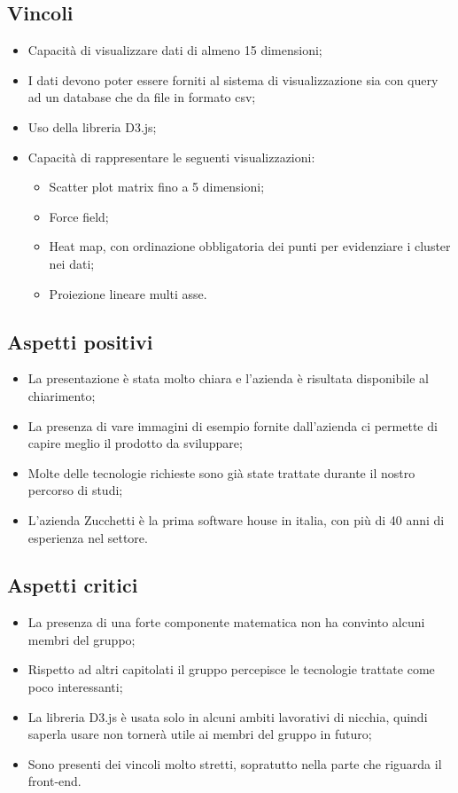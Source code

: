 \subsection{Vincoli}
\begin{itemize}
\item Capacità di visualizzare dati di almeno 15 dimensioni;
\item I dati devono poter essere forniti al sistema di visualizzazione sia con query ad un database che da file in formato csv;
\item Uso della libreria D3.js;
\item Capacità di rappresentare le seguenti visualizzazioni:
\begin{itemize}
	\item Scatter plot matrix fino a 5 dimensioni;
	\item Force field;
	\item Heat map, con ordinazione obbligatoria dei punti per evidenziare i cluster nei dati;
	\item Proiezione lineare multi asse.
\end{itemize}
\end{itemize}

\subsection{Aspetti positivi}
\begin{itemize}
\item La presentazione è stata molto chiara e l’azienda è risultata disponibile al chiarimento;
\item La presenza di vare immagini di esempio fornite dall'azienda ci permette di capire meglio il prodotto da sviluppare;
\item Molte delle tecnologie richieste sono già state trattate durante il nostro percorso di studi;
\item L’azienda Zucchetti è la prima software house in italia, con più di 40 anni di esperienza nel settore.
\end{itemize}

\subsection{Aspetti critici}
\begin{itemize}
\item La presenza di una forte componente matematica non ha convinto alcuni membri del gruppo;
\item Rispetto ad altri capitolati il gruppo percepisce le tecnologie trattate come poco interessanti;
\item La libreria D3.js è usata solo in alcuni ambiti lavorativi di nicchia, quindi saperla usare non tornerà utile ai membri del gruppo in futuro;
\item Sono presenti dei vincoli molto stretti, sopratutto nella parte che riguarda il front-end.
\end{itemize}

